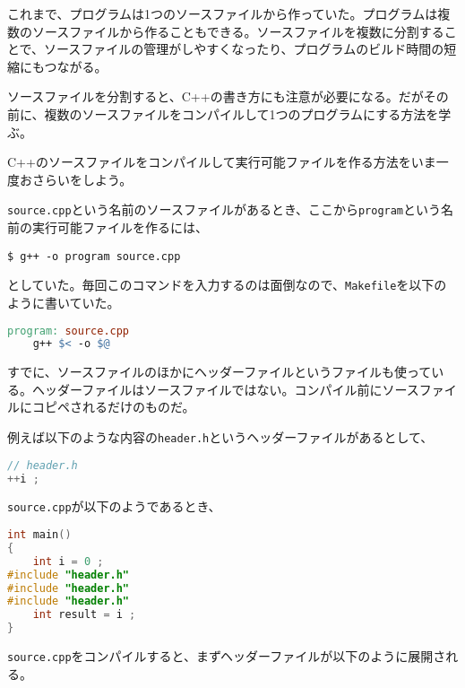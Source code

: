 
これまで、プログラムは1つのソースファイルから作っていた。プログラムは複数のソースファイルから作ることもできる。ソースファイルを複数に分割することで、ソースファイルの管理がしやすくなったり、プログラムのビルド時間の短縮にもつながる。


ソースファイルを分割すると、C++の書き方にも注意が必要になる。だがその前に、複数のソースファイルをコンパイルして1つのプログラムにする方法を学ぶ。


C++のソースファイルをコンパイルして実行可能ファイルを作る方法をいま一度おさらいをしよう。

\texttt{source.cpp}という名前のソースファイルがあるとき、ここから\texttt{program}という名前の実行可能ファイルを作るには、
\begin{lstlisting}[style=terminal]
$ g++ -o program source.cpp
\end{lstlisting}
としていた。毎回このコマンドを入力するのは面倒なので、\texttt{Makefile}を以下のように書いていた。

\begin{lstlisting}[language=make]
program: source.cpp
    g++ $< -o $@
\end{lstlisting}


すでに、ソースファイルのほかにヘッダーファイルというファイルも使っている。ヘッダーファイルはソースファイルではない。コンパイル前にソースファイルにコピペされるだけのものだ。

例えば以下のような内容の\texttt{header.h}というヘッダーファイルがあるとして、
\begin{lstlisting}[language={C++}]
// header.h
++i ;
\end{lstlisting}
\texttt{source.cpp}が以下のようであるとき、
\begin{lstlisting}[language={C++}]
int main()
{
    int i = 0 ;
#include "header.h"
#include "header.h"
#include "header.h"
    int result = i ;
}
\end{lstlisting}
\texttt{source.cpp}をコンパイルすると、まずヘッダーファイルが以下のように展開される。

